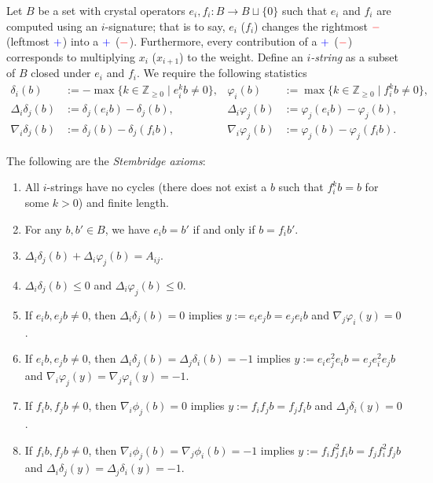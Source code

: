 \documentclass[ALCO,ThmDefs,Unicode,epreuves]{cedram}
\newcommand{\ZZ}{\mathbb{Z}}
\newcommand{\bplus}{{\color{blue}+}}
\newcommand{\bminus}{{\color{red}-}}
\newcommand{\defn}[1]{{\color{darkred}\emph{#1}}} %
\begin{document}
Let $B$ be a set with crystal operators $e_i, f_i \colon B \to B \sqcup \{0\}$ such that $e_i$ and $f_i$ are computed using an $i$-signature; that is to say, $e_i$ (\resp $f_i$) changes the rightmost $\bminus$ (\resp leftmost $\bplus$) into a $\bplus$ (\resp $\bminus$). Furthermore, every contribution of a $\bplus$ (\resp $\bminus$) corresponds to multiplying $x_i$ (\resp $x_{i+1}$) to the weight.
Define an \defn{$i$-string} as a subset of $B$ closed under $e_i$ and $f_i$.
We require the following statistics
\begin{align*}
\delta_i(b) & := -\max \{ k \in \ZZ_{\geq 0} \mid e_i^k b \neq 0 \},
&
\varphi_i(b) & := \max \{ k \in \ZZ_{\geq 0} \mid f_i^k b \neq 0 \},
\\
\Delta_i \delta_j(b) & := \delta_j(e_i b) - \delta_j(b),
&
\Delta_i \varphi_j(b) & := \varphi_j(e_i b) - \varphi_j(b),
\\
\nabla_i \delta_j(b) & := \delta_j(b) - \delta_j(f_i b),
&
\nabla_i \varphi_j(b) & := \varphi_j(b) - \varphi_j(f_i b).
\end{align*}

The following are the \defn{Stembridge axioms}:
\begin{enumerate}[(P\arabic*)]
\item\label{sec2.4-P1} %
All $i$-strings have no cycles (\ie there does not exist a $b$ such that $f_i^k b = b$ for some $k > 0$) and finite length.

\item\label{sec2.4-P2} %
For any $b, b' \in B$, we have $e_i b = b'$ if and only if $b = f_i b'$.

\item\label{sec2.4-P3} %
$\Delta_i \delta_j(b) + \Delta_i \varphi_j(b) = A_{ij}$.

\item\label{sec2.4-P4} %
$\Delta_i \delta_j(b) \leq 0$ and $\Delta_i \varphi_j(b) \leq 0$.

\item\label{sec2.4-P5} %
If $e_i b, e_j b \neq 0$, then $\Delta_i \delta_j(b) = 0$ implies $y := e_i e_j b = e_j e_i b$ and $\nabla_j \varphi_i(y) = 0$.

\item\label{sec2.4-P6} %
If $e_i b, e_j b \neq 0$, then $\Delta_i \delta_j(b) = \Delta_j \delta_i(b) = -1$ implies $y := e_i e_j^2 e_i b = e_j e_i^2 e_j b$ and $\nabla_i \varphi_j(y) = \nabla_j \varphi_i(y) = -1$.

\bgroup
\setcounter{enumi}{4}
\def\labelenumi{(P\arabic{enumi}$'$)}
\item\label{sec2.4-P5prime} %
If $f_i b, f_j b \neq 0$, then $\nabla_i \phi_j(b) = 0$ implies $y := f_i f_j b = f_j f_i b$ and $\Delta_j \delta_i(y) = 0$.

\item\label{sec2.4-P6prime} %
If $f_i b, f_j b \neq 0$, then $\nabla_i \phi_j(b) = \nabla_j \phi_i(b) = -1$ implies $y := f_i f_j^2 f_i b = f_j f_i^2 f_j b$ and $\Delta_i \delta_j(y) = \Delta_j \delta_i(y) = -1$.
\egroup
\end{enumerate}
\end{document}
